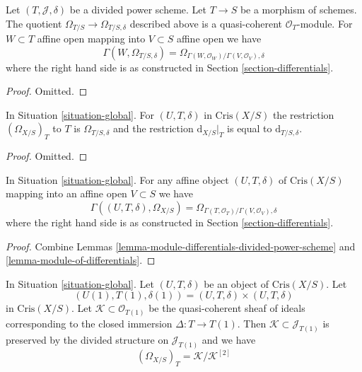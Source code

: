 \begin{lemma}
\label{lemma-module-differentials-divided-power-scheme}
Let $(T, \mathcal{J}, \delta)$ be a divided power scheme.
Let $T \to S$ be a morphism of schemes.
The quotient $\Omega_{T/S} \to \Omega_{T/S, \delta}$
described above is a quasi-coherent $\mathcal{O}_T$-module.
For $W \subset T$ affine open mapping into $V \subset S$ affine open
we have
$$
\Gamma(W, \Omega_{T/S, \delta}) =
\Omega_{\Gamma(W, \mathcal{O}_W)/\Gamma(V, \mathcal{O}_V), \delta}
$$
where the right hand side is
as constructed in Section \ref{section-differentials}.
\end{lemma}

\begin{proof}
Omitted.
\end{proof}

\begin{lemma}
\label{lemma-module-of-differentials}
In Situation \ref{situation-global}.
For $(U, T, \delta)$ in $\text{Cris}(X/S)$ the restriction
$(\Omega_{X/S})_T$ to $T$ is $\Omega_{T/S, \delta}$ and the restriction
$\text{d}_{X/S}|_T$ is equal to $\text{d}_{T/S, \delta}$.
\end{lemma}

\begin{proof}
Omitted.
\end{proof}

\begin{lemma}
\label{lemma-module-of-differentials-on-affine}
In Situation \ref{situation-global}.
For any affine object $(U, T, \delta)$ of $\text{Cris}(X/S)$
mapping into an affine open $V \subset S$ we have
$$
\Gamma((U, T, \delta), \Omega_{X/S}) =
\Omega_{\Gamma(T, \mathcal{O}_T)/\Gamma(V, \mathcal{O}_V), \delta}
$$
where the right hand side is
as constructed in Section \ref{section-differentials}.
\end{lemma}

\begin{proof}
Combine Lemmas \ref{lemma-module-differentials-divided-power-scheme} and
\ref{lemma-module-of-differentials}.
\end{proof}

\begin{lemma}
\label{lemma-describe-omega-small}
In Situation \ref{situation-global}.
Let $(U, T, \delta)$ be an object of $\text{Cris}(X/S)$.
Let
$$
(U(1), T(1), \delta(1)) = (U, T, \delta) \times (U, T, \delta)
$$
in $\text{Cris}(X/S)$. Let $\mathcal{K} \subset \mathcal{O}_{T(1)}$
be the quasi-coherent sheaf of ideals corresponding to the closed
immersion $\Delta : T \to T(1)$. Then
$\mathcal{K} \subset \mathcal{J}_{T(1)}$ is preserved by the
divided structure on $\mathcal{J}_{T(1)}$ and we have
$$
(\Omega_{X/S})_T = \mathcal{K}/\mathcal{K}^{[2]}
$$
\end{lemma}

